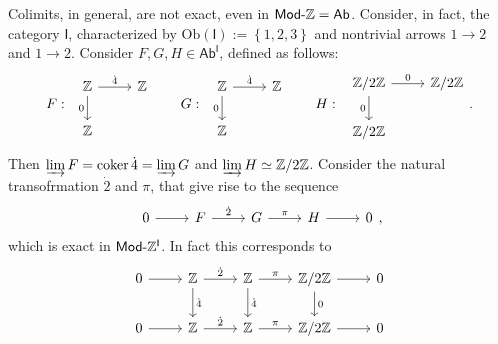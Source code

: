 \begin{rem}
	Colimits, in general, are not exact, even in $\mathsf{Mod}\text{-}\mathbb{Z} = \mathsf{Ab}$.
	Consider, in fact, the category $\mathsf{I}$, characterized by
	$\mathrm{Ob} \left(\mathsf{I}\right) := \left\{ 1, 2, 3 \right\}$ and nontrivial arrows
	$1 \to 2$ and $1 \to 2$.
	Consider $F, G, H \in \mathsf{Ab}^{\mathsf{I}}$, defined as follows:
	\begin{equation}
	F : \ \, 
	\begin{tikzcd}
		\Z \arrow[r, "\dot{4}", rightarrow] \arrow[d, "0"', rightarrow] & \Z \\
		\Z &
	\end{tikzcd}\qquad
	G : \ \,
	\begin{tikzcd}
		\Z \arrow[r, "\dot{4}", rightarrow] \arrow[d, "0"', rightarrow] & \Z \\
		\Z &
	\end{tikzcd}\qquad
	H : \ \,
	\begin{tikzcd}
		\mathbb{Z}/2\mathbb{Z} \arrow[r, "0", rightarrow] \arrow[d, "0"', rightarrow] & \mathbb{Z}/2\mathbb{Z} \\
		\mathbb{Z}/2\mathbb{Z} &
	\end{tikzcd}
	.\end{equation} 
	Then $\varinjlim F = \operatorname{coker} \dot{4} = \varinjlim G$ and $\varinjlim H \simeq \mathbb{Z}/2\mathbb{Z}$.
	Consider the natural transofrmation $\dot{2}$ and $\pi$, that give rise to the sequence
	\begin{equation}
	\begin{tikzcd}
		0 \arrow[r, "", rightarrow] &
		F \arrow[r, "\dot{2}", rightarrow] &
		G \arrow[r, "\pi", rightarrow] &
		H \arrow[r, "", rightarrow] &
		0
	\end{tikzcd}
	,\end{equation} 
	which is exact in $\mathsf{Mod}\text{-}\mathbb{Z}^{\mathsf{I}}$.
	In fact this corresponds to
	\begin{equation}
	\begin{tikzcd}
		0 \arrow[r, "", rightarrow] &
		\Z \arrow[r, "\dot{2}", rightarrow] \arrow[d, "\dot{4}", rightarrow] &
		\Z \arrow[r, "\pi", rightarrow] \arrow[d, "\dot{4}", rightarrow] &
		\mathbb{Z}/2\mathbb{Z} \arrow[r, "", rightarrow] \arrow[d, "0", rightarrow] &
		0 \\
		0 \arrow[r, "", rightarrow] &
		\Z \arrow[r, "\dot{2}", rightarrow]&
		\Z \arrow[r, "\pi", rightarrow] &
		\mathbb{Z}/2\mathbb{Z} \arrow[r, "", rightarrow] &
		0
	\end{tikzcd}
	\end{equation} 

\end{rem}
